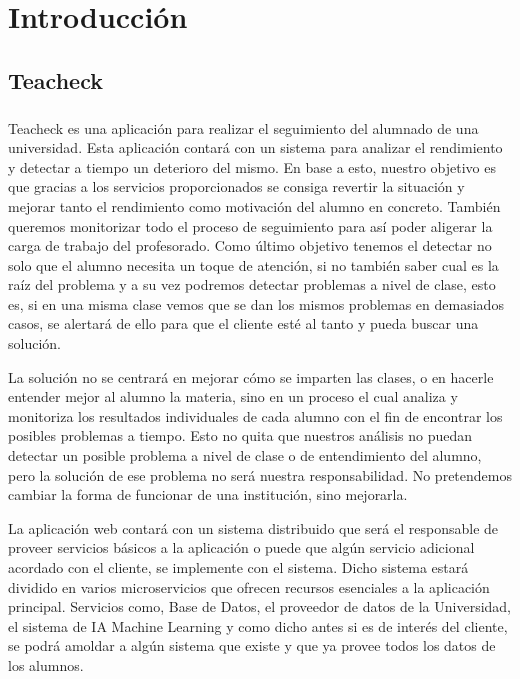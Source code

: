 \chapter{Introducción}
\section{Teacheck}
\paragraph{}
Teacheck es una aplicación para realizar el seguimiento del alumnado
de una universidad.  Esta aplicación contará con un sistema para
analizar el rendimiento y detectar a tiempo un deterioro del mismo. En
base a esto, nuestro objetivo es que gracias a los servicios
proporcionados se consiga revertir la situación y mejorar tanto el
rendimiento como motivación del alumno en concreto. También queremos
monitorizar todo el proceso de seguimiento para así poder aligerar la
carga de trabajo del profesorado. Como último objetivo tenemos el
detectar no solo que el alumno necesita un toque de atención, si no
también saber cual es la raíz del problema y a su vez podremos
detectar problemas a nivel de clase, esto es, si en una misma clase
vemos que se dan los mismos problemas en demasiados casos, se alertará
de ello para que el cliente esté al tanto y pueda buscar una solución.

La solución no se centrará en mejorar cómo se imparten las clases, o
en hacerle entender mejor al alumno la materia, sino en un proceso el
cual analiza y monitoriza los resultados individuales de cada alumno
con el fin de encontrar los posibles problemas a tiempo. Esto no quita
que nuestros análisis no puedan detectar un posible problema a nivel
de clase o de entendimiento del alumno, pero la solución de ese
problema no será nuestra responsabilidad. No pretendemos cambiar la
forma de funcionar de una institución, sino mejorarla.

La aplicación web contará con un sistema distribuido que será el
responsable de proveer servicios básicos a la aplicación o puede que
algún servicio adicional acordado con el cliente, se implemente con el
sistema. Dicho sistema estará dividido en varios microservicios que
ofrecen recursos esenciales a la aplicación principal. Servicios como,
Base de Datos, el proveedor de datos de la Universidad, el sistema de
IA Machine Learning y como dicho antes si es de interés del cliente,
se podrá amoldar a algún sistema que existe y que ya provee todos los
datos de los alumnos.

